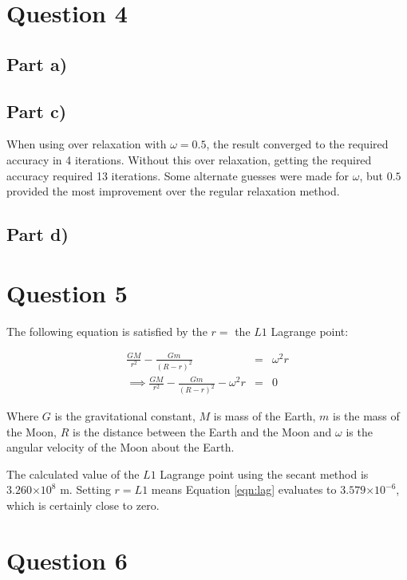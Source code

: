 \documentclass[a4paper,12pt]{article}
\providecommand{\e}[1]{\ensuremath{\times 10^{#1}}}
\begin{document}
\section{Question 4}

\subsection{Part a)}

\subsection{Part c)}

When using over relaxation with $\omega = 0.5$, the result converged to the required accuracy in 4 iterations. Without this over relaxation, getting the required accuracy required 13 iterations. Some alternate guesses were made for $\omega$, but $0.5$ provided the most improvement over the regular relaxation method.

\subsection{Part d)}

\section{Question 5}

The following equation is satisfied by the $r =$ the $L1$ Lagrange point:

\begin{eqnarray}
\frac{GM}{r^2} - \frac{Gm}{(R-r)^2} &=& \omega^2r\nonumber\\
\implies \frac{GM}{r^2} - \frac{Gm}{(R-r)^2} - \omega^2r &=& 0
\label{eqn:lag}
\end{eqnarray}

Where $G$ is the gravitational constant, $M$ is mass of the Earth, $m$ is the mass of the Moon, $R$ is the distance between the Earth and the Moon and $\omega$ is the angular velocity of the Moon about the Earth.

The calculated value of the $L1$ Lagrange point using the secant method is $3.260\e{8}$ m. Setting $r = L1$ means Equation \ref{eqn:lag} evaluates to $3.579\e{-6}$, which is certainly close to zero.

\section{Question 6}
\end{document}
